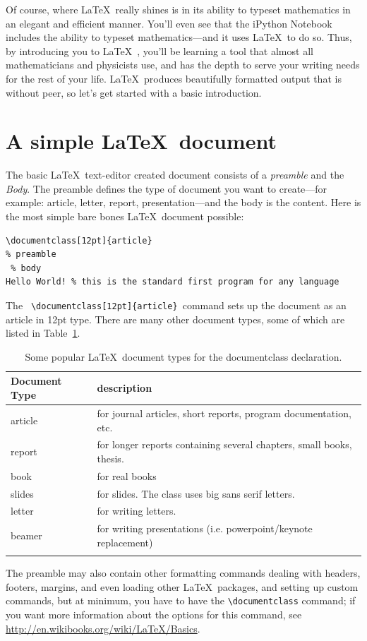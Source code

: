 Of course, where \LaTeX\ really shines is in its ability to typeset mathematics in an elegant and efficient manner. You'll even see that the iPython Notebook includes the ability to typeset mathematics---and it uses \LaTeX\ to do so. Thus, by introducing you to \LaTeX\ , you'll be learning a tool that almost all mathematicians and physicists use, and has the depth to serve your writing needs for the rest of your life. \LaTeX\ produces beautifully formatted output that is without peer, so let's get started with a basic introduction.


\section{A simple \LaTeX\ document}\label{sec:simple}
The basic \LaTeX\ text-editor created document consists of a \textit{preamble} and the \textit{Body}. The preamble defines the type of document you want to create---for example: article, letter, report, presentation---and the body is the content. Here is the most simple bare bones \LaTeX\ document possible:\\
\begin{lstlisting}[style=myLaTeXStyle, firstnumber=1]
\documentclass[12pt]{article}
% preamble
 % body
Hello World! % this is the standard first program for any language

\end{lstlisting}

The \verb! \documentclass[12pt]{article} !command sets up the document as an article in 12pt type. There are many other document types, some of which are listed in Table~\ref{tab:docTypes}.
\begin{table}
\caption{Some popular \LaTeX\ document types for the documentclass declaration.}
\label{tab:docTypes}
\vspace*{3mm}
\begin{tabular}{ll}
\toprule
Document Type			& description\\
\midrule
article &	for journal articles, short reports, program documentation, etc.\\
report	& for longer reports containing several chapters, small books, thesis.\\
book	& for real books\\
slides &for slides. The class uses big sans serif letters.\\
letter & for writing letters.\\
beamer &for writing presentations (i.e. powerpoint/keynote replacement)\\
\bottomrule
\vspace*{4mm}
\end{tabular}
\end{table}
The preamble may also contain other formatting commands dealing with headers, footers, margins, and even loading other \LaTeX\ packages, and setting up custom commands, but at minimum, you have to have the \verb!\documentclass! command; if you want more information about the options for this command, see \href{http://en.wikibooks.org/wiki/LaTeX/Basics}{http://en.wikibooks.org/wiki/LaTeX/Basics}.

